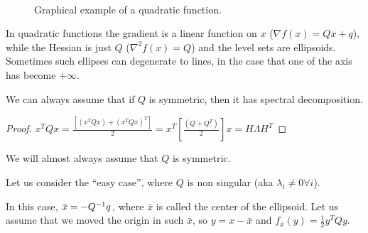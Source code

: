 \documentclass[computationalMathematics.tex]{subfiles}
\begin{document}
\begin{figure}[h]
  \centering
  \hspace{0.5cm}
  \\
  \caption{Graphical example of a quadratic function.}\label{fig:3ott_2}
\end{figure}

In quadratic functions the gradient is a linear function on $x$ ($\nabla f(x) = Q x + q$), while the Hessian is just $Q$ ($\nabla^2 f(x) = Q$) and the level sets are ellipsoids.
Sometimes such ellipses can degenerate to lines, in the case that one of the axis has become $+\infty$.

\begin{proposition}
  We can always assume that if $Q$ is symmetric, then it has spectral decomposition.
\end{proposition}

\begin{proof}
$x^T Q x = \frac{[(x^T Q x) + {(x^T Q x)}^T]}{2} = x^T [\frac{(Q + Q^T )}{2}] x = H \Lambda H^T$
\end{proof}

We will almost always assume that $Q$ is symmetric.

Let us consider the ``easy case'', where $Q$ is non singular (aka $\lambda_i \neq 0 \forall i$).

In this case,  $\bar{x} = - {Q}^{-1} q$, where $\bar{x}$ is called the center of the ellipsoid.
Let us assume that we moved the origin in such $\bar{x}$, so $y = x - \bar{x}$ and $f_{\bar{x}}(y) = \frac{1}{2} y^T Q y$.
\end{document}
